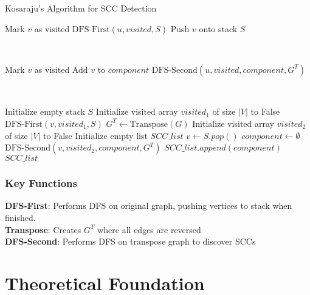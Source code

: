 \documentclass{book}
\theoremstyle{definition}
\begin{document}
\begin{engorithm}
\caption{Kosaraju's Algorithm for SCC Detection}
\begin{algorithmic}
    \State Mark $v$ as visited
            \State $\text{DFS-First}(u, visited, S)$
        \EndIf
    \EndFor
    \State Push $v$ onto stack $S$                
\end{algorithmic}
\\
\begin{algorithmic}
    \State Mark $v$ as visited
    \State Add $v$ to $component$
            \State $\text{DFS-Second}(u, visited, component, G^T)$
        \EndIf
    \EndFor
\end{algorithmic}
\\
\begin{algorithmic}
\State Initialize empty stack $S$
\State Initialize visited array $visited_1$ of size $|V|$ to False
        \State $\text{DFS-First}(v, visited_1, S)$
    \EndIf
\EndFor
\State $G^T \gets \text{Transpose}(G)$
\State Initialize visited array $visited_2$ of size $|V|$ to False
\State Initialize empty list $SCC\_list$
    \State $v \gets S.pop()$
        \State $component \gets \emptyset$
        \State $\text{DFS-Second}(v, visited_2, component, G^T)$
        \State $SCC\_list.append(component)$
    \EndIf
\EndWhile
\State \Return $SCC\_list$
\EndProcedure
\end{algorithmic}
\end{engorithm}

\subsubsection{Key Functions}


\textbf{DFS-First}: Performs DFS on original graph, pushing vertices to stack when finished.\\
\textbf{Transpose}: Creates $G^T$ where all edges are reversed\\
\textbf{DFS-Second}: Performs DFS on transpose graph to discover SCCs

\section{Theoretical Foundation}
\end{document}
